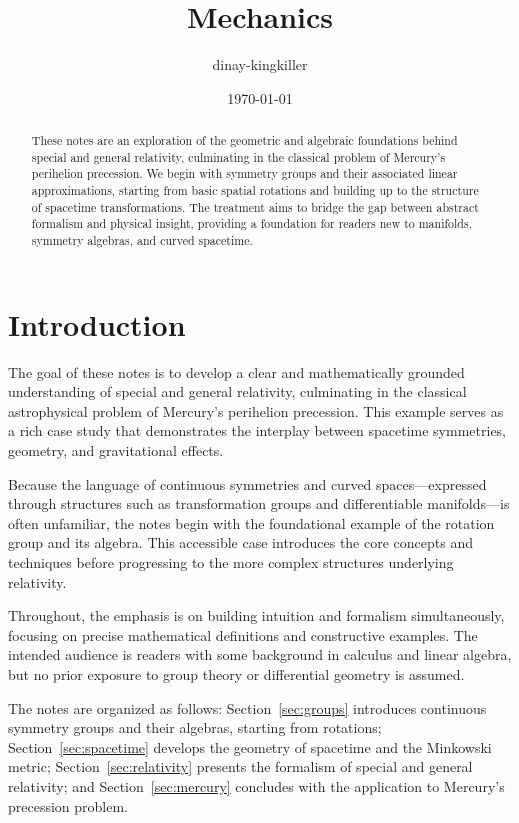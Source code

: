 \documentclass{amsart}
\theoremstyle{remark}
\begin{document}
\title{Mechanics}
\author{dinay-kingkiller}
\date{\today}


\begin{abstract}
  These notes are an exploration of the geometric and algebraic foundations behind special and general relativity, culminating in the classical problem of Mercury’s perihelion precession. We begin with symmetry groups and their associated linear approximations, starting from basic spatial rotations and building up to the structure of spacetime transformations. The treatment aims to bridge the gap between abstract formalism and physical insight, providing a foundation for readers new to manifolds, symmetry algebras, and curved spacetime.
\end{abstract}

\maketitle

\section{Introduction}

The goal of these notes is to develop a clear and mathematically grounded understanding of special and general relativity, culminating in the classical astrophysical problem of Mercury’s perihelion precession. This example serves as a rich case study that demonstrates the interplay between spacetime symmetries, geometry, and gravitational effects.

Because the language of continuous symmetries and curved spaces—expressed through structures such as transformation groups and differentiable manifolds—is often unfamiliar, the notes begin with the foundational example of the rotation group and its algebra. This accessible case introduces the core concepts and techniques before progressing to the more complex structures underlying relativity.

Throughout, the emphasis is on building intuition and formalism simultaneously, focusing on precise mathematical definitions and constructive examples. The intended audience is readers with some background in calculus and linear algebra, but no prior exposure to group theory or differential geometry is assumed.

The notes are organized as follows: Section~\ref{sec:groups} introduces continuous symmetry groups and their algebras, starting from rotations; Section~\ref{sec:spacetime} develops the geometry of spacetime and the Minkowski metric; Section~\ref{sec:relativity} presents the formalism of special and general relativity; and Section~\ref{sec:mercury} concludes with the application to Mercury’s precession problem.
\end{document}
